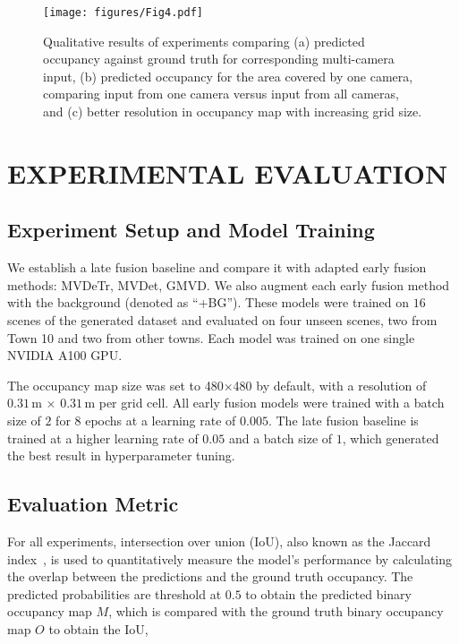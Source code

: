 \begin{figure*}[t]
    \centering
    \texttt{[image: figures/Fig4.pdf]}
    \caption{Qualitative results of experiments comparing (a) predicted occupancy against ground truth for corresponding multi-camera input, (b) predicted occupancy for the area covered by one camera, comparing input from one camera versus input from all cameras, and (c) better resolution in occupancy map with increasing grid size.}
    \label{fig:fig4}
\vspace{-0.2in}
\end{figure*}



\section{EXPERIMENTAL EVALUATION}
\label{experiments}

\subsection{Experiment Setup and Model Training}

We establish a late fusion baseline and compare it with adapted early fusion methods: MVDeTr, MVDet, GMVD. We also augment each early fusion method with the background (denoted as ``+BG''). These models were trained on $16$ scenes of the generated dataset and evaluated on four unseen scenes, two from Town 10 and two from other towns. Each model was trained on one single NVIDIA A100 GPU.

The occupancy map size was set to 480$\times$480 by default, with a resolution of $0.31\,\text{m}$ $\times$ $0.31\,\text{m}$ per grid cell. All early fusion models were trained with a batch size of $2$ for $8$ epochs at a learning rate of $0.005$. The late fusion baseline is trained at a higher learning rate of $0.05$ and a batch size of $1$, which generated the best result in hyperparameter tuning.

\subsection{Evaluation Metric}
\vspace{-0.02in}
For all experiments, intersection over union (IoU), also known as the Jaccard index~\cite{costa2021further}, is used to quantitatively measure the model's performance by calculating the overlap between the predictions and the ground truth occupancy. 
The predicted probabilities are threshold at $0.5$ to obtain the predicted binary occupancy map $M$, which is compared with the ground truth binary occupancy map $O$ to obtain the IoU,

